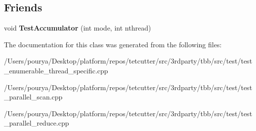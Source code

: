 \subsection*{Friends}
\begin{DoxyCompactItemize}
\item 
\hypertarget{classAccumulator_ad77ec1be498edcd27d905977d1b25ae6}{}void {\bfseries Test\+Accumulator} (int mode, int nthread)\label{classAccumulator_ad77ec1be498edcd27d905977d1b25ae6}

\end{DoxyCompactItemize}


The documentation for this class was generated from the following files\+:\begin{DoxyCompactItemize}
\item 
/\+Users/pourya/\+Desktop/platform/repos/tetcutter/src/3rdparty/tbb/src/test/test\+\_\+enumerable\+\_\+thread\+\_\+specific.\+cpp\item 
/\+Users/pourya/\+Desktop/platform/repos/tetcutter/src/3rdparty/tbb/src/test/test\+\_\+parallel\+\_\+scan.\+cpp\item 
/\+Users/pourya/\+Desktop/platform/repos/tetcutter/src/3rdparty/tbb/src/test/test\+\_\+parallel\+\_\+reduce.\+cpp\end{DoxyCompactItemize}
